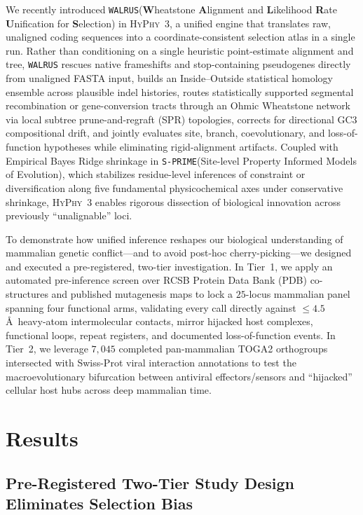 \documentclass[11pt,letterpaper]{article}
\newcommand{\HyPhyThree}{\textsc{HyPhy~3}\xspace}
\newcommand{\WALRUS}{\texttt{WALRUS}\xspace}
\newcommand{\SPRIME}{\texttt{S-PRIME}\xspace}
\begin{document}
We recently introduced \WALRUS (\textbf{W}heatstone \textbf{A}lignment and \textbf{L}ikelihood \textbf{R}ate \textbf{U}nification for \textbf{S}election) in \HyPhyThree \citep{kosakovsky2026walrus}, a unified engine that translates raw, unaligned coding sequences into a coordinate-consistent selection atlas in a single run. Rather than conditioning on a single heuristic point-estimate alignment and tree, \WALRUS rescues native frameshifts and stop-containing pseudogenes directly from unaligned FASTA input, builds an Inside--Outside statistical homology ensemble across plausible indel histories, routes statistically supported segmental recombination or gene-conversion tracts through an Ohmic Wheatstone network via local subtree prune-and-regraft (SPR) topologies, corrects for directional GC3 compositional drift, and jointly evaluates site, branch, coevolutionary, and loss-of-function hypotheses while eliminating rigid-alignment artifacts. Coupled with Empirical Bayes Ridge shrinkage in \SPRIME (Site-level Property Informed Models of Evolution), which stabilizes residue-level inferences of constraint or diversification along five fundamental physicochemical axes under conservative shrinkage, \HyPhyThree enables rigorous dissection of biological innovation across previously ``unalignable'' loci.

To demonstrate how unified inference reshapes our biological understanding of mammalian genetic conflict---and to avoid post-hoc cherry-picking---we designed and executed a pre-registered, two-tier investigation. In Tier~1, we apply an automated pre-inference screen over RCSB Protein Data Bank (PDB) co-structures \citep{berman2000protein} and published mutagenesis maps to lock a $25$-locus mammalian panel spanning four functional arms, validating every call directly against $\le 4.5$\,\AA\ heavy-atom intermolecular contacts, mirror hijacked host complexes, functional loops, repeat registers, and documented loss-of-function events. In Tier~2, we leverage $7,045$ completed pan-mammalian TOGA2 orthogroups \citep{kirilenko2023integrating} intersected with Swiss-Prot viral interaction annotations \citep{uniprot2023uniprot} to test the macroevolutionary bifurcation between antiviral effectors/sensors and ``hijacked'' cellular host hubs across deep mammalian time.

\section{Results}

\subsection{Pre-Registered Two-Tier Study Design Eliminates Selection Bias}
\end{document}
